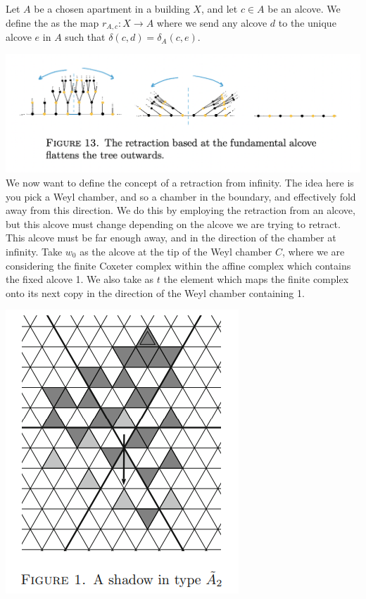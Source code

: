 \documentclass[11pt]{article}
\begin{document}
\begin{definition}
    Let $A$ be a chosen apartment in a building $X$, and let $c\in A$ be an alcove. We define the  as the map $r_{A,c}:X\longrightarrow A$ where we send any alcove $d$ to the unique alcove $e$ in $A$ such that $\delta(c,d)=\delta_A(c,e)$. 
\end{definition}

\includegraphics[scale=0.7]{Screenshot 2023-02-15 at 13.32.45.png}\\


We now want to define the concept of a retraction from infinity. The idea here is you pick a Weyl chamber, and so a chamber in the boundary, and effectively fold away from this direction. We do this by employing the retraction from an alcove, but this alcove must change depending on the alcove we are trying to retract. This alcove must be far enough away, and in the direction of the chamber at infinity. Take $w_0$ as the alcove at the tip of the Weyl chamber $C$, where we are considering the finite Coxeter complex within the affine complex which contains the fixed alcove 1. We also take as $t$ the element which maps the finite complex onto its next copy in the direction of the Weyl chamber containing 1. 

\begin{centering}
\includegraphics[scale=0.5]{Screenshot 2023-03-28 114049.png}\\
\end{centering}
\end{document}
